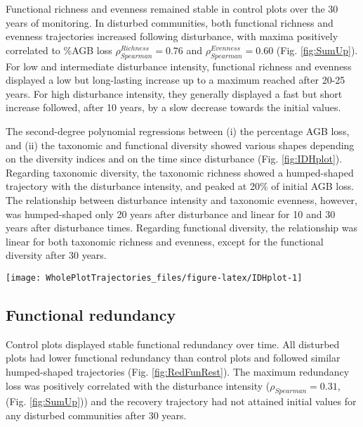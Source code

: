 \documentclass[fleqn,10pt]{ArtEcoFoG} %
\begin{document}
Functional richness and evenness remained stable in control plots over the 30 years of monitoring.
\color{red}In disturbed communities, both functional richness and evenness trajectories increased following disturbance, with maxima positively correlated to \%AGB loss \(\rho_{Spearman}^{Richness} = 0.76\) and \(\rho_{Spearman}^{Evenness} = 0.60\) (Fig. \ref{fig:SumUp}). \color{black}
For low \color{red}and intermediate \color{black}disturbance intensity, functional richness and evenness displayed a low but long-lasting increase up to a maximum reached after 20-25 years.
For high disturbance intensity, they generally displayed a fast but short increase followed, after 10 years, by a slow decrease towards the initial values.

The second-degree polynomial regressions between (i) the percentage AGB loss, and (ii) the taxonomic and functional diversity showed various shapes depending on the diversity indices and on the time since disturbance (Fig. \ref{fig:IDHplot}).
\color{red}Regarding taxonomic diversity, the taxonomic richness showed a humped-shaped trajectory with the disturbance intensity, and peaked at 20\% of initial AGB loss.
The relationship between disturbance intensity and taxonomic evenness, however, was humped-shaped only 20 years after disturbance and linear for 10 and 30 years after disturbance times.\color{black}
Regarding functional diversity, \color{red} the relationship was linear for both taxonomic richness and evenness, except for the functional diversity after 30 years. \color{black}

\begin{figure*}

{\centering \texttt{[image: WholePlotTrajectories\_files/figure-latex/IDHplot-1]} 

}

\caption{Relationship between the initial \%AGB loss and community taxonomic richness \textbf{(a)}, taxonomic evenness \textbf{(b)}, functional richness \textbf{(c)}, and functional evenness \textbf{(d)} at 10, 20, and 30 years after disturbance.}\label{fig:IDHplot}
\end{figure*}

\hypertarget{functional-redundancy}{%
\subsection{Functional redundancy}\label{functional-redundancy}}

Control plots displayed stable functional redundancy over time.
All disturbed plots had lower functional redundancy than control plots and followed similar humped-shaped trajectories (Fig. \ref{fig:RedFunRest}).
The maximum redundancy loss was positively correlated with the disturbance intensity (\(\rho_{Spearman}=0.31\), (Fig. \ref{fig:SumUp})) and the recovery trajectory had not attained initial values for any disturbed communities after 30 years.
\end{document}
